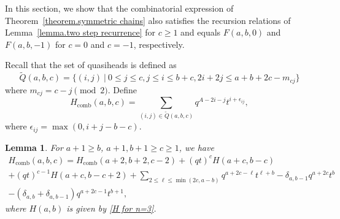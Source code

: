 \documentclass[11pt,reqno]{amsart}
\newcommand{\comb}{\operatorname{comb}}
\newtheorem{lemma}[theorem]{Lemma}
\theoremstyle{definition}
\numberwithin{equation}{section}
\begin{document}
In this section, we show that the combinatorial expression of Theorem~\ref{theorem.symmetric chains} also satisfies
the recursion relations of Lemma~\ref{lemma.two step recurrence} for $c\geqslant 1$ and equals $F(a,b,0)$
and $F(a,b,-1)$ for $c=0$ and $c=-1$, respectively.

Recall that the set of quasiheads is defined as
\[
	\widetilde{Q}(a,b,c)=\{(i,j)\ |\ 0\leqslant j\leqslant c,j\leqslant i\leqslant b+c, 2i+2j\leqslant a+b+2c-m_{cj}\}
\]
where $m_{cj}=c-j \pmod{2}$. Define
\begin{equation}
\label{equation.H comb}
	H_{\comb}(a,b,c)=\sum_{(i,j)\in\widetilde{Q}(a,b,c)}q^{A-2i-j}t^{i+\epsilon_{ij}},
\end{equation}
where $\epsilon_{ij}=\max(0,i+j-b-c)$.

\begin{lemma}
\label{lem: recursion H comb}
For $a+1 \geqslant b$, $a+1,b+1 \geqslant c\geqslant 1$, we have
\begin{multline}
	H_{\comb}(a,b,c) = H_{\comb}(a+2,b+2,c-2) + (qt)^{c}H(a+c,b-c)\\
	+(qt)^{c-1}H(a+c,b-c+2)+
	\sum_{2\leqslant \ell \leqslant \min(2c,a-b)} q^{a+2c-\ell}t^{\ell+b}
	-\delta_{a,b-1}q^{a+2c}t^{b}\\
	-(\delta_{a,b}+\delta_{a,b-1})q^{a+2c-1}t^{b+1},
\end{multline}
where $H(a,b)$ is given by \eqref{H for n=3}.
\end{lemma}
\end{document}
